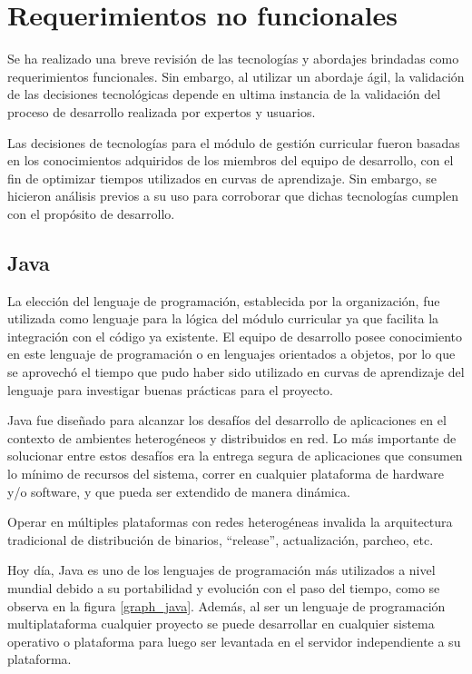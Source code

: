 \section{Requerimientos no funcionales} \label{reqnofuncional}
Se ha realizado una breve revisión de las tecnologías y abordajes brindadas como requerimientos funcionales. Sin embargo, al utilizar un abordaje ágil, la validación de las decisiones tecnológicas depende en ultima instancia de la validación del proceso de desarrollo realizada por expertos y usuarios.

Las decisiones de tecnologías para el módulo de gestión curricular fueron basadas en los conocimientos adquiridos de los miembros del equipo de desarrollo, con el fin de optimizar tiempos utilizados en curvas de aprendizaje. Sin embargo, se hicieron análisis previos a su uso para corroborar que dichas tecnologías cumplen con el propósito de desarrollo.

\subsection{Java}
La elección del lenguaje de programación, establecida por la organización, fue utilizada como lenguaje para la lógica del módulo curricular ya que facilita la integración con el código ya existente. El equipo de desarrollo posee conocimiento en este lenguaje de programación o en lenguajes orientados a objetos, por lo que se aprovechó el tiempo que pudo haber sido utilizado en curvas de aprendizaje del lenguaje para investigar buenas prácticas para el proyecto.

Java fue diseñado para alcanzar los desafíos del desarrollo de aplicaciones en el contexto de ambientes heterogéneos y distribuidos en red\citep{eckel_thinking_2006}. Lo más importante de solucionar entre estos desafíos era la entrega segura de aplicaciones que consumen lo mínimo de recursos del sistema, correr en cualquier plataforma de hardware y/o software, y que pueda ser extendido de manera dinámica\citep{sierra2005head}.

Operar en múltiples plataformas con redes heterogéneas invalida la arquitectura tradicional de distribución de binarios, \enquote{release}, actualización, parcheo, etc\citep{arnold2005java}.

Hoy día, Java es uno de los lenguajes de programación más utilizados a nivel mundial debido a su portabilidad y evolución con el paso del tiempo, como se observa en la figura \ref{graph_java}. Además, al ser un lenguaje de programación multiplataforma cualquier proyecto se puede desarrollar en cualquier sistema operativo o plataforma para luego ser levantada en el servidor independiente a su plataforma. 

